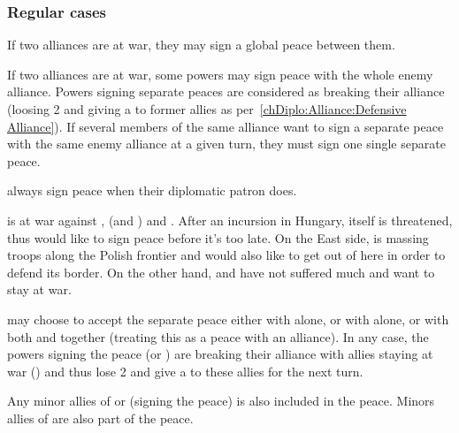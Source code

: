 \subsubsection{Regular cases}
 If two alliances are at war, they may sign a global
peace between them.

 If two alliances are at war, some
powers may sign peace with the whole enemy alliance.
\bparag Powers signing separate peaces are considered as breaking their
alliance (loosing 2 \STAB and giving a \CB to former allies as
per~\ref{chDiplo:Alliance:Defensive Alliance}).
\bparag If several members of the same alliance want to sign a separate peace
with the same enemy alliance at a given turn, they must sign one single
separate peace.

 always sign peace when their diplomatic patron does.

\begin{exemple}
  \TUR is at war against \VEN, \HIS (and \AUS) and \POL. After an incursion in
  Hungary, \provinceVeneto itself is threatened, thus \VEN would like to sign
  peace before it's too late. On the East side, \RUS is massing troops along
  the Polish frontier and \POL would also like to get out of here in order to
  defend its border. On the other hand, \HIS and \AUS have not suffered much
  and want to stay at war.

  \TUR may choose to accept the separate peace either with \VEN alone, or with
  \POL alone, or with both \VEN and \POL together (treating this as a peace
  with an alliance). In any case, the powers signing the peace (\VEN or \POL)
  are breaking their alliance with allies staying at war (\HIS) and thus lose
  2 \STAB and give a \CB to these allies for the next turn.

  Any minor allies of \VEN or \POL (signing the peace) is also included in the
  peace. Minors allies of \TUR are also part of the peace.
\end{exemple}

